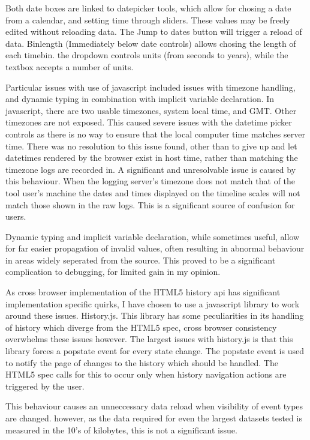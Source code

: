 Both date boxes are linked to datepicker tools, which allow for chosing a date from a calendar, and setting time through sliders. These values may be freely edited without reloading data. The Jump to dates button will trigger a reload of data. 
Binlength (Immediately below date controls) allows chosing the length of each timebin. the dropdown controls units (from seconds to years), while the textbox accepts a number of units.

Particular issues with use of javascript included issues with timezone handling, and dynamic typing in combination with implicit variable declaration. In javascript, there are two usable timezones, system local time, and GMT. Other timezones are not exposed. This caused severe issues with the datetime picker controls as there is no way to ensure that the local computer time matches server time. There was no resolution to this issue found, other than to give up and let datetimes rendered by the browser exist in host time, rather than matching the timezone logs are recorded in. A significant and unresolvable issue is caused by this behaviour. When the logging server's timezone does not match that of the tool user's machine the dates and times displayed on the timeline scales will not match those shown in the raw logs. This is a significant source of confusion for users.

Dynamic typing and implicit variable declaration, while sometimes useful, allow for far easier propagation of invalid values, often resulting in abnormal behaviour in areas widely seperated from the source. This proved to be a significant complication to debugging, for limited gain in my opinion. 

As cross browser implementation of the HTML5 history api has significant implementation specific quirks, I have chosen to use a javascript library to work around these issues. History.js. This library has some peculiarities in its handling of history which diverge from the HTML5 spec, cross browser consistency overwhelms these issues however.  The largest issues with history.js is that this library forces a popstate event for every state change. The popstate event is used to notify the page of changes to the history which should be handled. The HTML5 spec calls for this to occur only when history navigation actions are triggered by the user.

This behaviour causes an unneccessary data reload when visibility of event types are changed. however, as the data required for even the largest datasets tested is measured in the 10's of kilobytes, this is not a significant issue. 

